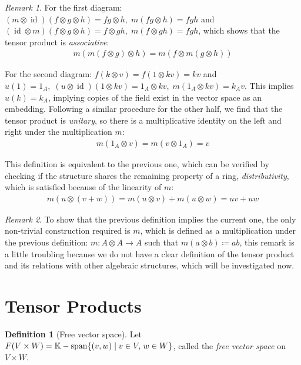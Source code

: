 \documentclass{article}
\theoremstyle{definition}
\newtheorem{Definition}{Definition}
\theoremstyle{remark}
\newtheorem*{Remark*}{Remark}
\theoremstyle{underline}
\theoremstyle{underline}
\DeclareMathOperator{\id}{id}
\begin{document}
\begin{Remark*}
For the first diagram: $(m \otimes \id)(f \otimes g \otimes h) = fg \otimes h,\; m(fg \otimes h) = fgh $ and $(\id \otimes m)(f \otimes g \otimes h) = f \otimes g h,\; m(f \otimes gh) = fgh $, which shows that the tensor product is \emph{associative}:
\begin{gather*}
	m(m(f \otimes g) \otimes h) = m(f \otimes m(g \otimes h))
\end{gather*}

For the second diagram: $f(k \otimes v) = f(1 \otimes kv) = kv$ and $u(1) = 1_A, \;(u \otimes \id)(1 \otimes kv) = 1_A \otimes kv, \; m(1_A \otimes kv) = k_Av$. This implies $u(k) = k_A$, implying copies of the field exist in the vector space as an embedding. Following a similar procedure for the other half, we find that the tensor product is \emph{unitary}, so there is a multiplicative identity on the left and right under the multiplication $m$:
\begin{gather*}
	m(1_A \otimes v) = m(v \otimes 1_A) = v
\end{gather*}

This definition is equivalent to the previous one, which can be verified by checking if the structure shares the remaining property of a ring, \emph{distributivity}, which is satisfied because of the linearity of $m$:
\begin{gather*}
	m(u \otimes (v + w)) = m(u \otimes v) + m(u \otimes w) = uv + uw
\end{gather*}
\end{Remark*}

\begin{Remark*}
To show that the previous definition implies the current one, the only non-trivial construction required is $m$, which is defined as a multiplication under the previous definition: $m\colon A \otimes A \rightarrow A$ such that $ m(a \otimes b) \coloneqq ab $, this remark is a little troubling because we do not have a clear definition of the tensor product and its relations with other algebraic structures, which will be investigated now.
\end{Remark*}

\section{Tensor Products}

\begin{Definition}[Free vector space]
Let $F(V \times W) = \mathbb K-\mathrm{span}\qty{(v, w) \mid v \in V,\, w \in W}$, called the \emph{free vector space} on $V \times W$.
\end{Definition}
\end{document}
